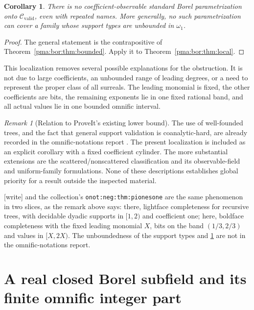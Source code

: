 \documentclass[11pt]{article}
\numberwithin{equation}{section}
\newtheorem{corollary}[corollary]{Corollary}
\theoremstyle{definition}
\theoremstyle{remark}
\newtheorem{remark}[remark]{Remark}
\newcommand{\writetag}{\textup{\textsf{\small[write]}}}
\newcommand{\replabel}[1]{\nolinkurl{#1}}
\begin{document}
\begin{corollary}
\label{pma:bor:cor:localobservable}
There is no coefficient-observable standard Borel parametrization onto
$\mathcal C_{\mathrm{valid}}$, even with repeated names. More generally,
no such parametrization can cover a family whose support types are
unbounded in $\omega_1$.
\end{corollary}
\begin{proof}
The general statement is the contrapositive of
Theorem~\ref{pma:bor:thm:bounded}. Apply it to Theorem~\ref{pma:bor:thm:local}.
\end{proof}

This localization removes several possible explanations for the obstruction.
It is not due to large coefficients, an unbounded range of leading degrees,
or a need to represent the proper class of all surreals. The leading monomial
is fixed, the other coefficients are bits, the remaining exponents lie in one
fixed rational band, and all actual values lie in one bounded omnific interval.

\begin{remark}[Relation to ProveIt's existing lower bound]
The use of well-founded trees, and the fact that general support validation
is coanalytic-hard, are already recorded in the omnific-notations report
\cite{RepoNotations}. The present localization is included as an explicit
corollary with a fixed coefficient cylinder. The more substantial extensions
are the scattered/nonscattered classification and its observable-field and
uniform-family formulations. None of these descriptions establishes global
priority for a result outside the inspected material.
\end{remark}

\noindent\writetag{}  and the collection's
\replabel{onot:neg:thm:pionesone} are the same phenomenon in two slices, as
the remark above says: there, lightface completeness for recursive trees,
with decidable dyadic supports in $[1,2)$ and coefficient one; here, boldface
completeness with the fixed leading monomial $X$, bits on the band
$(1/3,2/3)$ and values in $[X,2X)$. The unboundedness of the support types and
\cref{pma:bor:cor:localobservable} are not in the omnific-notations report.

\section{A real closed Borel subfield and its finite omnific integer part}
\label{pma:bor:sec:Puiseux}
\end{document}
